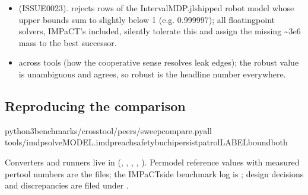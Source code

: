 \documentclass[a4paper,10pt,english]{sphinxmanual}
\begin{document}
\begin{itemize}
\item {} 
\sphinxAtStartPar
{} (ISSUE\sphinxhyphen{}0023).  rejects rows of the IntervalMDP.jl\sphinxhyphen{}shipped robot model whose upper bounds sum
to slightly below 1 (e.g. 0.999997); all floating\sphinxhyphen{}point solvers, IMPaCT’s included,
silently tolerate this and assign the missing \textasciitilde{}3e\sphinxhyphen{}6 mass to the best successor.

\item {} 
\sphinxAtStartPar
{} across tools (how the cooperative sense
resolves \sphinxcode{\sphinxupquote{{[}0,hi{]}}} leak edges); the robust value is unambiguous and agrees, so robust is
the headline number everywhere.

\end{itemize}


\subsection{Reproducing the comparison}
\label{\detokenize{comparison/index:reproducing-the-comparison}}
\begin{sphinxVerbatim}[commandchars=\\\{\}]
python3benchmarks/crosstool/peers/sweep\PYGZus{}compare.pyall
tools/imdp\PYGZus{}solveMODEL.imdpreachsafetybuchipersistpatrolLABEL\PYGZhy{}\PYGZhy{}boundboth
\end{sphinxVerbatim}

\sphinxAtStartPar
Converters and runners live in  (,
, , ,
). Per\sphinxhyphen{}model reference values with measured per\sphinxhyphen{}tool numbers are the
 files; the IMPaCT\sphinxhyphen{}side benchmark log is
; design decisions and discrepancies are filed under .
\end{document}
